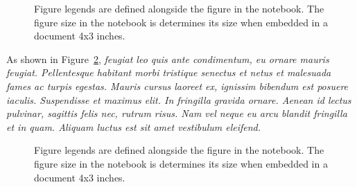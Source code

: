 \documentclass[
  10pt,
  a4paper,
]{scrbook}
\let\oldemph\emph
\renewcommand\emph[1]{\oldemph{\color{gray}#1}} %
\begin{document}
\begin{figure}[H]


\caption{\label{fig-danishinteraction}Figure legends are defined
alongside the figure in the notebook. The figure size in the notebook is
determines its size when embedded in a document 4x3 inches.}

\end{figure}%

As shown in Figure~\ref{fig-meaninformality}, \emph{feugiat leo quis
ante condimentum, eu ornare mauris feugiat. Pellentesque habitant morbi
tristique senectus et netus et malesuada fames ac turpis egestas. Mauris
cursus laoreet ex, ignissim bibendum est posuere iaculis. Suspendisse et
maximus elit. In fringilla gravida ornare. Aenean id lectus pulvinar,
sagittis felis nec, rutrum risus. Nam vel neque eu arcu blandit
fringilla et in quam. Aliquam luctus est sit amet vestibulum eleifend.}

\begin{figure}[H]


\caption{\label{fig-meaninformality}Figure legends are defined alongside
the figure in the notebook. The figure size in the notebook is
determines its size when embedded in a document 4x3 inches.}

\end{figure}%
\end{document}

